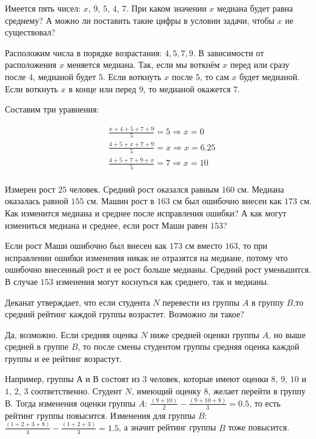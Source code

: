 \documentclass[12pt, a4paper, oneside]{article}
\theoremstyle{plain} %
\theoremstyle{definition}
\begin{document}
\begin{problem} 
Имеется пять чисел: $x$, $9$, $5$, $4$, $7$. При каком значении $x$ медиана будет равна среднему? А можно ли поставить такие цифры в условии задачи, чтобы $x$ не существовал?
\end{problem}

\begin{solution}
Расположим числа в порядке возрастания: $4,5,7,9$. В зависимости от расположения $x$ меняется медиана. Так, если мы воткнём $x$ перед или сразу после $4$, медианой будет $5$. Если воткнуть $x$ после $5$, то сам $x$ будет медианой. Если воткнуть $x$ в конце или перед $9$, то медианой окажется $7$. 

Составим три уравнения: 

\begin{equation*} 
\begin{aligned}
& \frac{x + 4 + 5 + 7 + 9}{5} = 5 \Rightarrow x = 0 \\
& \frac{4 + 5 + x + 7 + 9}{5} = x \Rightarrow x = 6.25 \\
& \frac{4 + 5 + 7 + 9 + x}{5} = 7 \Rightarrow x = 10 \\
\end{aligned}
\end{equation*}
\end{solution}


\begin{problem}
Измерен рост $25$ человек. Средний рост оказался равным $160$ см. Медиана оказалась равной $155$ см. Машин рост в $163$ см был ошибочно внесен как $173$ см. Как изменится медиана и среднее после исправления ошибки? А как могут измениться медиана и среднее, если рост Маши равен $153$?
\end{problem}
 
\begin{solution}
Если рост Маши ошибочно был внесен как $173$ см вместо $163$, то при исправлении ошибки изменения никак не отразятся на медиане, потому что ошибочно внесенный рост и ее рост больше медианы. Средний рост уменьшится. В случае $153$ изменения могут коснуться как среднего, так и медианы. 
\end{solution}


\begin{problem}
Деканат утверждает, что если студента $N$ перевести из группы $A$ в группу $B$,то средний рейтинг каждой группы возрастет. Возможно ли такое?
\end{problem}

\begin{solution}
Да, возможно. Если средняя оценка $N$ ниже средней оценки группы $A$, но выше средней в группе $B$, то после смены студентом группы средняя оценка каждой группы и ее рейтинг возрастут.

Например, группы $А$ и $В$ состоят из $3$ человек, которые имеют оценки $8$, $9$, $10$ и $1$, $2$, $3$ соответственно. Студент $N$, имеющий оценку $8$, желает перейти в группу $В$. Тогда изменения оценки группы $A$:  $\frac{(9+10)}{2} - \frac{(9+10+8)}{3} = 0.5$, то есть рейтинг группы повысится. Изменения для группы $B$:   $\frac{(1+2+3+8)}{4} - \frac{(1+2+3)}{3} = 1.5$, а значит рейтинг группы $B$ тоже повысится.
\end{solution}
\end{document}
